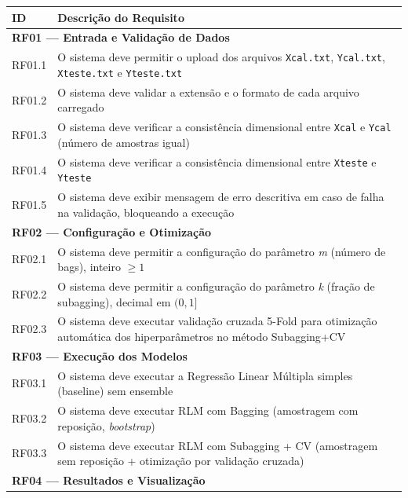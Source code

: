 \documentclass[12pt,a4paper]{article}
\begin{document}
\begin{quadro}[ht]
\centering
\small
\caption{Especificação dos requisitos funcionais (RF01--RF05)}
\label{quadro:rfs}
\begin{threeparttable}
\begin{tabularx}{\textwidth}{|l|X|} \hline
\textbf{ID} & \textbf{Descrição do Requisito} \\ \hline
\multicolumn{2}{|l|}{\textbf{RF01 --- Entrada e Validação de Dados}} \\ \hline
RF01.1 & O sistema deve permitir o upload dos arquivos \texttt{Xcal.txt}, \texttt{Ycal.txt}, \texttt{Xteste.txt} e \texttt{Yteste.txt} \\ \hline
RF01.2 & O sistema deve validar a extensão e o formato de cada arquivo carregado \\ \hline
RF01.3 & O sistema deve verificar a consistência dimensional entre \texttt{Xcal} e \texttt{Ycal} (número de amostras igual) \\ \hline
RF01.4 & O sistema deve verificar a consistência dimensional entre \texttt{Xteste} e \texttt{Yteste} \\ \hline
RF01.5 & O sistema deve exibir mensagem de erro descritiva em caso de falha na validação, bloqueando a execução \\ \hline
\multicolumn{2}{|l|}{\textbf{RF02 --- Configuração e Otimização}} \\ \hline
RF02.1 & O sistema deve permitir a configuração do parâmetro \textit{m} (número de bags), inteiro $\ge 1$ \\ \hline
RF02.2 & O sistema deve permitir a configuração do parâmetro \textit{k} (fração de subagging), decimal em $(0, 1]$ \\ \hline
RF02.3 & O sistema deve executar validação cruzada 5-Fold para otimização automática dos hiperparâmetros no método Subagging+CV \\ \hline
\multicolumn{2}{|l|}{\textbf{RF03 --- Execução dos Modelos}} \\ \hline
RF03.1 & O sistema deve executar a Regressão Linear Múltipla simples (baseline) sem ensemble \\ \hline
RF03.2 & O sistema deve executar RLM com Bagging (amostragem com reposição, \textit{bootstrap}) \\ \hline
RF03.3 & O sistema deve executar RLM com Subagging + CV (amostragem sem reposição + otimização por validação cruzada) \\ \hline
\multicolumn{2}{|l|}{\textbf{RF04 --- Resultados e Visualização}} \\ \hline

\end{tabularx}
\end{threeparttable}
\end{quadro}
\end{document}
